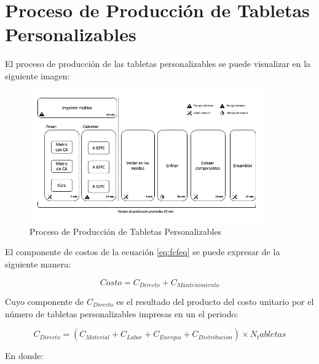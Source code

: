 \documentclass[
]{book}
\begin{document}
\newpage

\hypertarget{proceso-de-producciuxf3n-de-tabletas-personalizables}{%
\section{Proceso de Producción de Tabletas Personalizables}\label{proceso-de-producciuxf3n-de-tabletas-personalizables}}

El proceso de producción de las tabletas personalizables se puede
visualizar en la siguiente imagen:

\begin{figure}
\centering
\includegraphics[width=0.9\textwidth,height=\textheight]{Diagramas/ProcesoProduccion.jpg}
\caption{Proceso de Producción de Tabletas
Personalizables}
\end{figure}

El componente de costos de la ecuación \eqref{eq:fcfeq} se puede expresar
de la siguiente manera:

\begin{equation}
  Costo = C_{Directo} + C_{Mantenimiento} \label{eq:costos}
\end{equation}

Cuyo componente de \(C_{Directo}\) es el resultado del producto del costo unitario
por el número de tabletas personalizables impresas en un el periodo:

\begin{equation}
  C_{Directo}=\left(C_{Material}+C_{Labor}+C_{Energia}+C_{Distribucion}\right)
  \times N_tabletas
  \label{eq:costodirecto}
\end{equation}

En donde:
\end{document}
